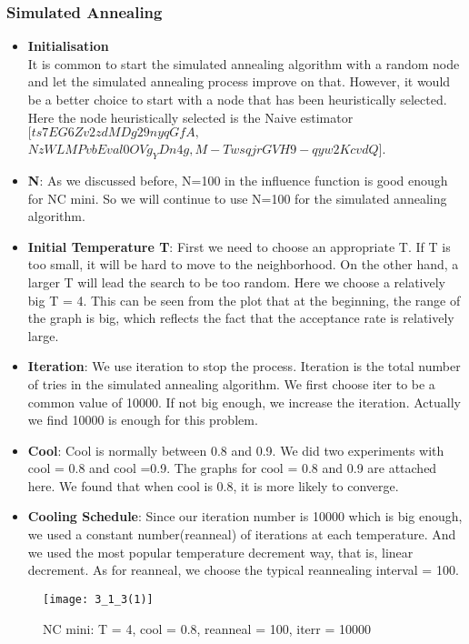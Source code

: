 \documentclass{article}
\begin{document}
\subsubsection{Simulated Annealing}   %
\begin{itemize}
    \item \textbf{Initialisation}\\
It is common to start the simulated annealing algorithm with a random node and let the simulated annealing process improve on that. However, it would be a better choice to start with a node that has been heuristically selected. Here the node heuristically selected is the Naive estimator $[ts7EG6Zv2zdMDg29nyqGfA, $
$NzWLMPvbEval0OVg_YDn4g, M-TwsqjrGVH9-qyw2KcvdQ]$. 
    \item \textbf{N}: As we discussed before, N=100 in the influence function is good enough for NC mini. So we will continue to use N=100 for the simulated annealing algorithm. 
    \item \textbf{Initial Temperature T}: First we need to choose an appropriate T. If T is too small, it will be hard to move to the neighborhood. On the other hand, a larger T will lead the search to be too random. Here we choose a relatively big T = 4. This can be seen from the plot that at the beginning, the range of the graph is big, which reflects the fact that the acceptance rate is relatively large. 
    \item \textbf{Iteration}: We use iteration to stop the process. Iteration is the total number of tries in the simulated annealing algorithm. We first choose iter to be a common value of 10000. If not big enough, we increase the iteration. Actually we find 10000 is enough for this problem. 
        \item \textbf{Cool}: Cool is normally between 0.8 and 0.9. We did two experiments with cool = 0.8 and cool =0.9. The graphs for cool = 0.8 and 0.9 are attached here. We found that when cool is 0.8, it is more likely to converge. 
    \item \textbf{Cooling Schedule}: Since our iteration number is 10000 which is big enough, we used a constant number(reanneal) of iterations at each temperature. And we used the most popular temperature decrement way, that is, linear decrement. As for reanneal, we choose the typical reannealing interval = 100.
\end{itemize}

\begin{figure}[h]
\begin{center}
\texttt{[image: 3\_1\_3(1)]} %
\caption{NC mini: T = 4, cool = 0.8, reanneal = 100, iterr = 10000}
\end{center}
\end{figure}
\end{document}
